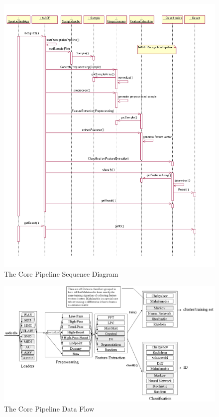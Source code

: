 \begin{figure}
	\centering
	\includegraphics[angle=90,totalheight=660pt,width=550pt]{../graphics/arch/pipeline.png}
	\caption{The Core Pipeline Sequence Diagram}
	\label{fig:pipeline}
\end{figure}

\begin{figure}
    \centering
    \includegraphics[width=\textwidth]{../graphics/arch/pipeline-flow.png}
    \caption{The Core Pipeline Data Flow}
    \label{fig:pipeline-flow}
\end{figure}

